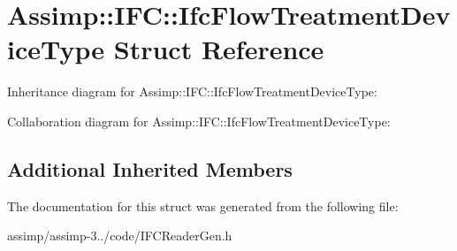\hypertarget{struct_assimp_1_1_i_f_c_1_1_ifc_flow_treatment_device_type}{\section{Assimp\+:\+:I\+F\+C\+:\+:Ifc\+Flow\+Treatment\+Device\+Type Struct Reference}
\label{struct_assimp_1_1_i_f_c_1_1_ifc_flow_treatment_device_type}
}


Inheritance diagram for Assimp\+:\+:I\+F\+C\+:\+:Ifc\+Flow\+Treatment\+Device\+Type\+:


Collaboration diagram for Assimp\+:\+:I\+F\+C\+:\+:Ifc\+Flow\+Treatment\+Device\+Type\+:
\subsection*{Additional Inherited Members}


The documentation for this struct was generated from the following file\+:\begin{DoxyCompactItemize}
\item 
assimp/assimp-\/3../code/I\+F\+C\+Reader\+Gen.\+h\end{DoxyCompactItemize}
